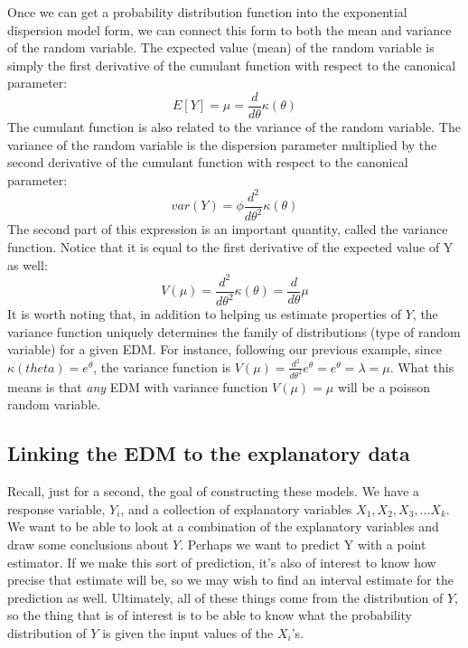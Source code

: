 \documentclass[
]{book}
\begin{document}
Once we can get a probability distribution function into the exponential dispersion model form, we can connect this form to both the mean and variance of the random variable. The expected value (mean) of the random variable is simply the first derivative of the cumulant function with respect to the canonical parameter:
\[
E[Y] =\mu= \frac{d}{d\theta}\kappa(\theta)
\]
The cumulant function is also related to the variance of the random variable. The variance of the random variable is the dispersion parameter multiplied by the second derivative of the cumulant function with respect to the canonical parameter:
\[
var(Y) = \phi \frac{d^2}{d\theta^2} \kappa(\theta)
\]
The second part of this expression is an important quantity, called the variance function. Notice that it is equal to the first derivative of the expected value of Y as well:
\[
V(\mu) = \frac{d^2}{d\theta^2} \kappa(\theta) = \frac{d}{d\theta}\mu
\]
It is worth noting that, in addition to helping us estimate properties of \(Y\), the variance function uniquely determines the family of distributions (type of random variable) for a given EDM. For instance, following our previous example, since \(\kappa(theta) = e^{\theta}\), the variance function is \(V(\mu) = \frac{d^2}{d\theta^2} e^\theta = e^\theta = \lambda = \mu\). What this means is that \emph{any} EDM with variance function \(V(\mu) = \mu\) will be a poisson random variable.

\hypertarget{linking-the-edm-to-the-explanatory-data}{%
\subsection{Linking the EDM to the explanatory data}\label{linking-the-edm-to-the-explanatory-data}}

Recall, just for a second, the goal of constructing these models. We have a response variable, \(Y_i\), and a collection of explanatory variables \(X_1, X_2, X_3,...X_k\). We want to be able to look at a combination of the explanatory variables and draw some conclusions about \(Y\). Perhaps we want to predict Y with a point estimator. If we make this sort of prediction, it's also of interest to know how precise that estimate will be, so we may wish to find an interval estimate for the prediction as well. Ultimately, all of these things come from the distribution of \(Y\), so the thing that is of interest is to be able to know what the probability distribution of \(Y\) is given the input values of the \(X_i\)'s.
\end{document}

